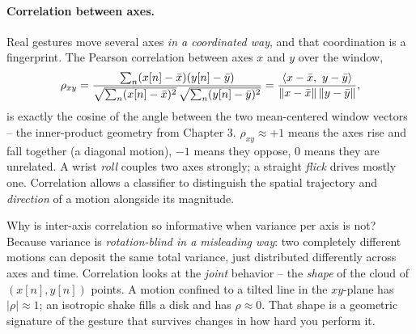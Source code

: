 \paragraph{Correlation between axes.} Real gestures move several axes \emph{in a
coordinated way}, and that coordination is a fingerprint. The Pearson correlation
between axes $x$ and $y$ over the window,
\begin{equation}
\label{ch38:corr}
  \rho_{xy} = \frac{\sum_{n}(x[n]-\bar x)(y[n]-\bar y)}
                   {\sqrt{\sum_n (x[n]-\bar x)^2}\,\sqrt{\sum_n (y[n]-\bar y)^2}}
            = \frac{\langle x-\bar x,\, \,y-\bar y \rangle}{\lVert x-\bar x\rVert\,\lVert y-\bar y\rVert},
\end{equation}
is exactly the cosine of the angle between the two mean-centered window vectors --
the inner-product geometry from Chapter 3. $\rho_{xy} \approx +1$ means the axes
rise and fall together (a diagonal motion), $-1$ means they oppose, $0$ means they
are unrelated. A wrist \emph{roll} couples two axes strongly; a straight
\emph{flick} drives mostly one. Correlation allows a classifier to distinguish the spatial trajectory and
\emph{direction} of a motion alongside its magnitude.

\begin{whybox}
Why is inter-axis correlation so informative when variance per axis is not?
Because variance is \emph{rotation-blind in a misleading way}: two completely
different motions can deposit the same total variance, just distributed
differently across axes and time. Correlation looks at the \emph{joint} behavior
-- the \emph{shape} of the cloud of $(x[n],y[n])$ points. A motion confined to a
tilted line in the $xy$-plane has $|\rho| \approx 1$; an isotropic shake fills a
disk and has $\rho \approx 0$. That shape is a geometric signature of the gesture
that survives changes in how hard you perform it.
\end{whybox}


